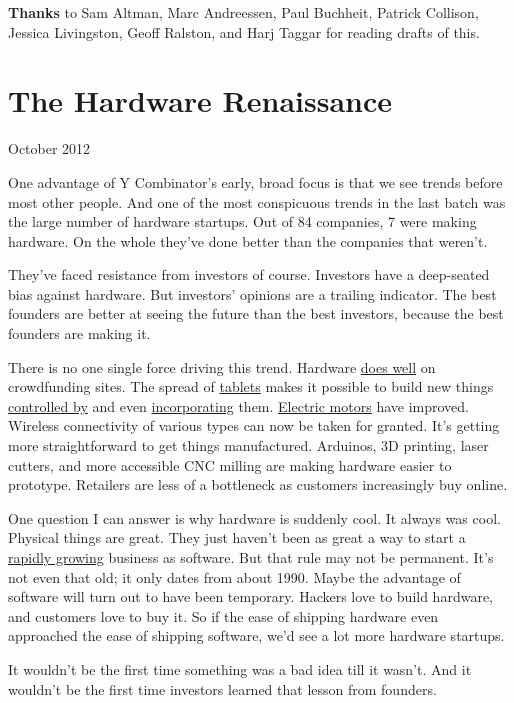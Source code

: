 \documentclass[12pt]{book}
\begin{document}
\textbf{Thanks} to Sam Altman, Marc Andreessen, Paul Buchheit, Patrick
Collison, Jessica Livingston, Geoff Ralston, and Harj Taggar for reading
drafts of this.
\chapter{The Hardware Renaissance}

October 2012

One advantage of Y Combinator's early, broad focus is that we see trends
before most other people. And one of the most conspicuous trends in the
last batch was the large number of hardware startups. Out of 84
companies, 7 were making hardware. On the whole they've done better than
the companies that weren't.

They've faced resistance from investors of course. Investors have a
deep-seated bias against hardware. But investors' opinions are a
trailing indicator. The best founders are better at seeing the future
than the best investors, because the best founders are making it.

There is no one single force driving this trend. Hardware
\href{http://bits.blogs.nytimes.com/2012/05/11/pebble-smartwatch-tops-out-at-10-million-on-kickstarter/}{does
well} on crowdfunding sites. The spread of
\href{http://paulgraham.com/tablets.html}{tablets} makes it possible to
build new things \href{http://lockitron.com}{controlled by} and even
\href{http://doublerobotics.com}{incorporating} them.
\href{http://www.boostedboards.com/}{Electric motors} have improved.
Wireless connectivity of various types can now be taken for granted.
It's getting more straightforward to get things manufactured. Arduinos,
3D printing, laser cutters, and more accessible CNC milling are making
hardware easier to prototype. Retailers are less of a bottleneck as
customers increasingly buy online.

One question I can answer is why hardware is suddenly cool. It always
was cool. Physical things are great. They just haven't been as great a
way to start a \href{growth.html}{rapidly growing} business as software.
But that rule may not be permanent. It's not even that old; it only
dates from about 1990. Maybe the advantage of software will turn out to
have been temporary. Hackers love to build hardware, and customers love
to buy it. So if the ease of shipping hardware even approached the ease
of shipping software, we'd see a lot more hardware startups.

It wouldn't be the first time something was a bad idea till it wasn't.
And it wouldn't be the first time investors learned that lesson from
founders.
\end{document}
